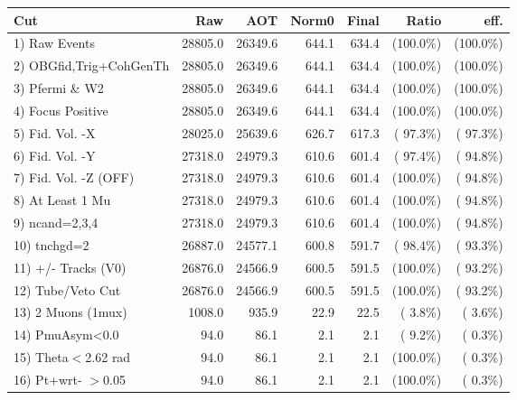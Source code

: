  \begin{table}[h!]\centering
 \begin{tabular}{||l||r|r|r|r|r|r||}
 \hline
 \hline
 Cut & Raw & AOT & Norm0 & Final & Ratio & eff.       \\
 \hline
  1) Raw Events           &      28805.0 &      26349.6 &        644.1 &        634.4 & (100.0\%) & (100.0\%) \\
  2) OBGfid,Trig+CohGenTh &      28805.0 &      26349.6 &        644.1 &        634.4 & (100.0\%) & (100.0\%) \\
  3) Pfermi \& W2         &      28805.0 &      26349.6 &        644.1 &        634.4 & (100.0\%) & (100.0\%) \\
  4) Focus Positive       &      28805.0 &      26349.6 &        644.1 &        634.4 & (100.0\%) & (100.0\%) \\
  5) Fid. Vol. -X         &      28025.0 &      25639.6 &        626.7 &        617.3 & ( 97.3\%) & ( 97.3\%) \\
  6) Fid. Vol. -Y         &      27318.0 &      24979.3 &        610.6 &        601.4 & ( 97.4\%) & ( 94.8\%) \\
  7) Fid. Vol. -Z (OFF)   &      27318.0 &      24979.3 &        610.6 &        601.4 & (100.0\%) & ( 94.8\%) \\
  8) At Least 1 Mu        &      27318.0 &      24979.3 &        610.6 &        601.4 & (100.0\%) & ( 94.8\%) \\
  9) ncand=2,3,4          &      27318.0 &      24979.3 &        610.6 &        601.4 & (100.0\%) & ( 94.8\%) \\
 10) tnchgd=2             &      26887.0 &      24577.1 &        600.8 &        591.7 & ( 98.4\%) & ( 93.3\%) \\
 11) +/- Tracks (V0)      &      26876.0 &      24566.9 &        600.5 &        591.5 & (100.0\%) & ( 93.2\%) \\
 12) Tube/Veto Cut        &      26876.0 &      24566.9 &        600.5 &        591.5 & (100.0\%) & ( 93.2\%) \\
 13) 2 Muons (1mux)       &       1008.0 &        935.9 &         22.9 &         22.5 & (  3.8\%) & (  3.6\%) \\
 14) PmuAsym<0.0          &         94.0 &         86.1 &          2.1 &          2.1 & (  9.2\%) & (  0.3\%) \\
 15) Theta$<$2.62 rad     &         94.0 &         86.1 &          2.1 &          2.1 & (100.0\%) & (  0.3\%) \\
 16) Pt+wrt- $>$0.05      &         94.0 &         86.1 &          2.1 &          2.1 & (100.0\%) & (  0.3\%) \\

\end{tabular}
\end{table}
